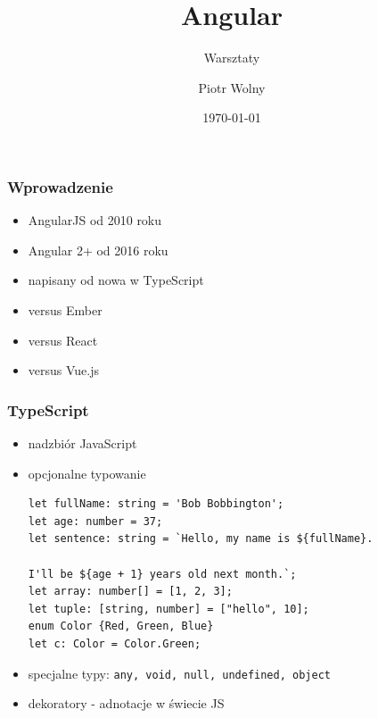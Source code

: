 \documentclass{beamer}
\title{Angular}
\subtitle{Warsztaty}
\author{Piotr Wolny}
\institute{e-point SA}
\date{\today}
\begin{document}
\begin{frame}
    \titlepage
\end{frame}

\begin{frame}
    \frametitle{Wprowadzenie}
    \begin{itemize}
        \item AngularJS od 2010 roku
        \item Angular 2+ od 2016 roku
        \item napisany od nowa w TypeScript
        \item versus Ember
        \item versus React
        \item versus Vue.js
    \end{itemize}
\end{frame}

\begin{frame}[fragile]
    \frametitle{TypeScript}
    \begin{itemize}
        \item nadzbiór JavaScript
        \item opcjonalne typowanie
\begin{lstlisting}
let fullName: string = 'Bob Bobbington';
let age: number = 37;
let sentence: string = `Hello, my name is ${fullName}.

I'll be ${age + 1} years old next month.`;
let array: number[] = [1, 2, 3];
let tuple: [string, number] = ["hello", 10];
enum Color {Red, Green, Blue}
let c: Color = Color.Green;
\end{lstlisting}
        \item specjalne typy: \lstinline{any, void, null, undefined, object}
        \item dekoratory - adnotacje w świecie JS
    \end{itemize}
\end{frame}
\end{document}
